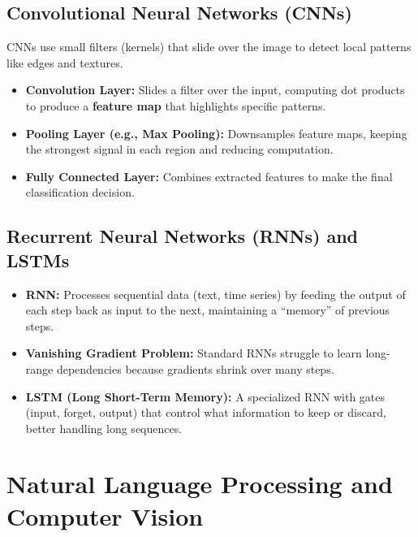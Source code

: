 \documentclass[11pt,a4paper]{article}
\begin{document}
\subsection{Convolutional Neural Networks (CNNs)}
\begin{conceptbox}
CNNs use small filters (kernels) that slide over the image to detect local patterns like edges and textures.
\end{conceptbox}
\begin{itemize}[leftmargin=*]
  \item \textbf{Convolution Layer:} Slides a filter over the input, computing dot products to produce a \textbf{feature map} that highlights specific patterns.
  \item \textbf{Pooling Layer (e.g., Max Pooling):} Downsamples feature maps, keeping the strongest signal in each region and reducing computation.
  \item \textbf{Fully Connected Layer:} Combines extracted features to make the final classification decision.
\end{itemize}

\subsection{Recurrent Neural Networks (RNNs) and LSTMs}
\begin{itemize}[leftmargin=*]
  \item \textbf{RNN:} Processes sequential data (text, time series) by feeding the output of each step back as input to the next, maintaining a ``memory'' of previous steps.
  \item \textbf{Vanishing Gradient Problem:} Standard RNNs struggle to learn long-range dependencies because gradients shrink over many steps.
  \item \textbf{LSTM (Long Short-Term Memory):} A specialized RNN with gates (input, forget, output) that control what information to keep or discard, better handling long sequences.
\end{itemize}

\section{Natural Language Processing and Computer Vision}
\end{document}
